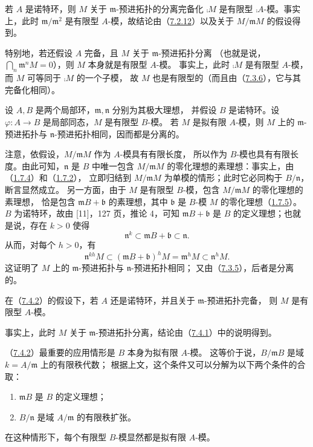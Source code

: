 若 $A$ 是诺特环，则 $M$ 关于 $\mathfrak m$-预进拓扑的分离完备化
$\comp M$ 是有限型 $\comp A$-模。事实上，此时 $\mathfrak m/\mathfrak m^2$
是有限型 $A$-模，故结论由（\hyperlink{para:0:7.2.12}{7.2.12}）以及关于 $M/\mathfrak mM$ 的假设得到。

特别地，若还假设 $A$ 完备，且 $M$ 关于 $\mathfrak m$-预进拓扑分离
（也就是说，$\bigcap_n\mathfrak m^nM=0$），则 $M$ 本身就是有限型 $A$-模。
事实上，此时 $\comp M$ 是有限型 $A$-模，而 $M$ 可等同于 $\comp M$ 的一个子模，
故 $M$ 也是有限型的（而且由（\hyperlink{para:0:7.3.6}{7.3.6}），它与其完备化相同）。

设 $A,B$ 是两个局部环，$\mathfrak m,\mathfrak n$ 分别为其极大理想，
并假设 $B$ 是诺特环。设 $\varphi:A\to B$ 是局部同态，$M$ 是有限型 $B$-模。
若 $M$ 是拟有限 $A$-模，则 $M$ 上的 $\mathfrak m$-预进拓扑与
$\mathfrak n$-预进拓扑相同，因而都是分离的。

注意，依假设，$M/\mathfrak mM$ 作为 $A$-模具有有限长度，
所以作为 $B$-模也具有有限长度。由此可知，$\mathfrak n$ 是 $B$ 中唯一包含
$M/\mathfrak mM$ 的零化理想的素理想：事实上，由（\hyperlink{para:0:1.7.4}{1.7.4}）和（\hyperlink{para:0:1.7.2}{1.7.2}），
立即归结到 $M/\mathfrak mM$ 为单模的情形；此时它必同构于 $B/\mathfrak n$，
断言显然成立。
另一方面，由于 $M$ 是有限型 $B$-模，包含 $M/\mathfrak mM$ 的零化理想的素理想，
恰是包含 $\mathfrak mB+\mathfrak b$ 的素理想，其中 $\mathfrak b$ 是
$B$-模 $M$ 的零化理想（\hyperlink{para:0:1.7.5}{1.7.5}）。
$B$ 为诺特环，故由 [11]，127 页，推论 4，可知 $\mathfrak mB+\mathfrak b$
是 $B$ 的定义理想；也就是说，存在 $k>0$ 使得
\[
 \mathfrak n^k\subset\mathfrak mB+\mathfrak b\subset\mathfrak n.
\]
从而，对每个 $h>0$，有
\[
 \mathfrak n^{kh}M\subset(\mathfrak mB+\mathfrak b)^hM
 =\mathfrak m^hM\subset\mathfrak n^hM.
\]
这证明了 $M$ 上的 $\mathfrak m$-预进拓扑与 $\mathfrak n$-预进拓扑相同；
又由（\hyperlink{para:0:7.3.5}{7.3.5}），后者是分离的。

在（\hyperlink{para:0:7.4.2}{7.4.2}）的假设下，若 $A$ 还是诺特环，并且关于 $\mathfrak m$-预进拓扑完备，
则 $M$ 是有限型 $A$-模。

事实上，此时 $M$ 关于 $\mathfrak m$-预进拓扑分离，结论由（\hyperlink{para:0:7.4.1}{7.4.1}）中的说明得到。

（\hyperlink{para:0:7.4.2}{7.4.2}）最重要的应用情形是 $B$ 本身为拟有限 $A$-模。
这等价于说，$B/\mathfrak mB$ 是域 $k=A/\mathfrak m$ 上的有限秩代数；
根据上文，这个条件又可以分解为以下两个条件的合取：
\begin{enumerate}[label=(\roman*)]
\item $\mathfrak mB$ 是 $B$ 的定义理想；
\item $B/\mathfrak n$ 是域 $A/\mathfrak m$ 的有限秩扩张。
\end{enumerate}
在这种情形下，每个有限型 $B$-模显然都是拟有限 $A$-模。

